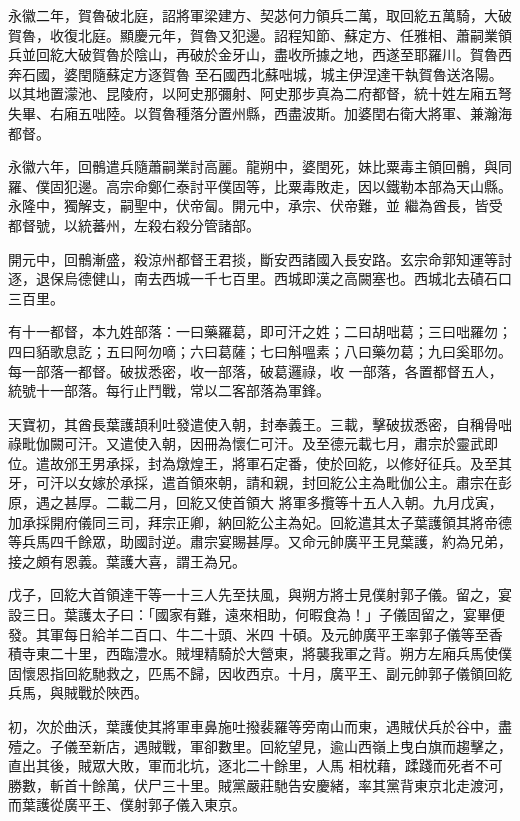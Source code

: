 \begin{pinyinscope}
 永徽二年，賀魯破北庭，詔將軍梁建方、契苾何力領兵二萬，取回紇五萬騎，大破賀魯，收復北庭。顯慶元年，賀魯又犯邊。詔程知節、蘇定方、任雅相、蕭嗣業領兵並回紇大破賀魯於陰山，再破於金牙山，盡收所據之地，西遂至耶羅川。賀魯西奔石國，婆閏隨蘇定方逐賀魯
 至石國西北蘇咄城，城主伊涅達干執賀魯送洛陽。以其地置濛池、昆陵府，以阿史那彌射、阿史那步真為二府都督，統十姓左廂五弩失畢、右廂五咄陸。以賀魯種落分置州縣，西盡波斯。加婆閏右衛大將軍、兼瀚海都督。



 永徽六年，回鶻遣兵隨蕭嗣業討高麗。龍朔中，婆閏死，妹比粟毒主領回鶻，與同羅、僕固犯邊。高宗命鄭仁泰討平僕固等，比粟毒敗走，因以鐵勒本部為天山縣。永隆中，獨解支，嗣聖中，伏帝匐。開元中，承宗、伏帝難，並
 繼為酋長，皆受都督號，以統蕃州，左殺右殺分管諸部。



 開元中，回鶻漸盛，殺涼州都督王君掞，斷安西諸國入長安路。玄宗命郭知運等討逐，退保烏德健山，南去西城一千七百里。西城即漢之高闕塞也。西城北去磧石口三百里。



 有十一都督，本九姓部落：一曰藥羅葛，即可汗之姓；二曰胡咄葛；三曰咄羅勿；四曰貊歌息訖；五曰阿勿嘀；六曰葛薩；七曰斛嗢素；八曰藥勿葛；九曰奚耶勿。每一部落一都督。破拔悉密，收一部落，破葛邏祿，收
 一部落，各置都督五人，統號十一部落。每行止鬥戰，常以二客部落為軍鋒。



 天寶初，其酋長葉護頡利吐發遣使入朝，封奉義王。三載，擊破拔悉密，自稱骨咄祿毗伽闕可汗。又遣使入朝，因冊為懷仁可汗。及至德元載七月，肅宗於靈武即位。遣故邠王男承採，封為燉煌王，將軍石定番，使於回紇，以修好征兵。及至其牙，可汗以女嫁於承採，遣首領來朝，請和親，封回紇公主為毗伽公主。肅宗在彭原，遇之甚厚。二載二月，回紇又使首領大
 將軍多攬等十五人入朝。九月戊寅，加承採開府儀同三司，拜宗正卿，納回紇公主為妃。回紇遣其太子葉護領其將帝德等兵馬四千餘眾，助國討逆。肅宗宴賜甚厚。又命元帥廣平王見葉護，約為兄弟，接之頗有恩義。葉護大喜，謂王為兄。



 戊子，回紇大首領達干等一十三人先至扶風，與朔方將士見僕射郭子儀。留之，宴設三日。葉護太子曰：「國家有難，遠來相助，何暇食為！」子儀固留之，宴畢便發。其軍每日給羊二百口、牛二十頭、米四
 十碩。及元帥廣平王率郭子儀等至香積寺東二十里，西臨澧水。賊埋精騎於大營東，將襲我軍之背。朔方左廂兵馬使僕固懷恩指回紇馳救之，匹馬不歸，因收西京。十月，廣平王、副元帥郭子儀領回紇兵馬，與賊戰於陜西。



 初，次於曲沃，葉護使其將軍車鼻施吐撥裴羅等旁南山而東，遇賊伏兵於谷中，盡殪之。子儀至新店，遇賊戰，軍卻數里。回紇望見，逾山西嶺上曳白旗而趨擊之，直出其後，賊眾大敗，軍而北坑，逐北二十餘里，人馬
 相枕藉，蹂踐而死者不可勝數，斬首十餘萬，伏尸三十里。賊黨嚴莊馳告安慶緒，率其黨背東京北走渡河，而葉護從廣平王、僕射郭子儀入東京。




\end{pinyinscope}
